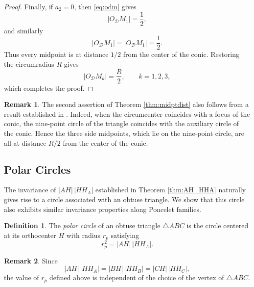 \documentclass[11pt,reqno]{amsart}
\theoremstyle{definition}
\newtheorem{definition}{Definition}[section]
\newtheorem{remark}{Remark}[section]
\numberwithin{equation}{section}
\begin{document}
\begin{proof}
Finally, if $a_2=0$, then \eqref{eq:odm} gives
\[
|O_{\mathcal D}M_1|
=
\frac12,
\]
and similarly
\[
|O_{\mathcal D}M_1|=|O_{\mathcal D}M_1|=\frac12.
\]
Thus every midpoint is at distance $1/2$ from the center of the conic. Restoring the circumradius $R$ gives
\[
|O_{\mathcal D}M_k|=\frac{R}{2},
\qquad k=1,2,3,
\]
which completes the proof.
\end{proof}


\begin{remark}
The second assertion of Theorem \ref{thm:midptdist} also follows from a result established in \cite[Corollary 3.4]{Dragovic-Murad2026}. Indeed, when the circumcenter coincides with a focus of the conic, the nine-point circle of the triangle coincides with the auxiliary circle of the conic. Hence the three side midpoints, which lie on the nine-point circle, are all at distance $R/2$ from the center of the conic.
\end{remark}

\subsection{Polar Circles}\label{sec:polcirc}
The invariance of $|AH|\,|HH_A|$ established in Theorem \ref{thm:AH_HHA} naturally gives rise to a  circle associated with an obtuse triangle. We show that this circle also exhibits similar invariance properties along Poncelet families.

\begin{definition}\label{def:polarcirc}
The \emph{polar circle} of an obtuse triangle $\triangle ABC$ is the circle centered at its orthocenter $H$ with radius $r_p$ satisfying
\[
r_p^2=|AH|\,|HH_A|.
\]
\end{definition}
\begin{remark}
    Since
    \[
    |AH|\,|HH_A|=|BH|\,|HH_B|=|CH|\,|HH_C|,
    \]
    the value of $r_p$ defined above is independent of the choice of the vertex of $\triangle ABC$.
\end{remark}
\end{document}
